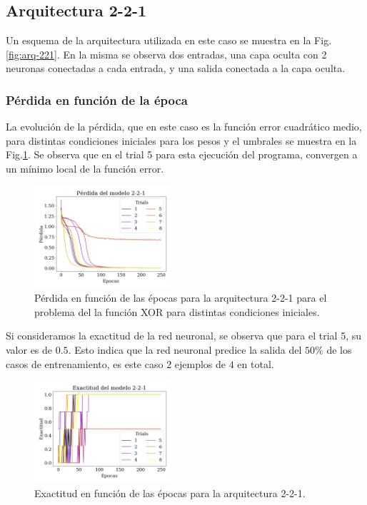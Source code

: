 \subsection*{Arquitectura 2-2-1}

Un esquema de la arquitectura utilizada en este caso se muestra en la Fig.\,\ref{fig:arq-221}. En la misma se observa dos entradas, una capa oculta con 2 neuronas conectadas a cada entrada, y una salida conectada a la capa oculta.

\subsubsection*{Pérdida en función de la época}

La evolución de la pérdida, que en este caso es la función  error cuadrático medio,  para distintas condiciones iniciales para los pesos y el umbrales se muestra en la Fig.\ref{fig:XOR_err_221}. Se observa que en el trial 5 para esta ejecución del programa, convergen a un mínimo local de la función error.

\begin{figure}[H]
	\centering
	\includegraphics[width=0.45\textwidth]{../Graficos/ejer_1_2-2-1_los.png}
	\caption{Pérdida en función de las épocas para la arquitectura 2-2-1 para el problema del la función XOR para distintas condiciones iniciales.}
	\label{fig:XOR_err_221}
\end{figure}
Si consideramos la exactitud de la red neuronal, se observa que para el trial 5, su valor es de $0.5$. Esto indica que la red neuronal predice la salida del $50\%$ de los casos de entrenamiento, es este caso $2$ ejemplos de $4$  en total.

\begin{figure}[H]
	\centering
	\includegraphics[width=0.45\textwidth]{../Graficos/ejer_1_2-2-1_acc.png}
	\caption{Exactitud en función de las épocas para la arquitectura 2-2-1.}
	\label{fig:XOR_acc_221}
\end{figure}

